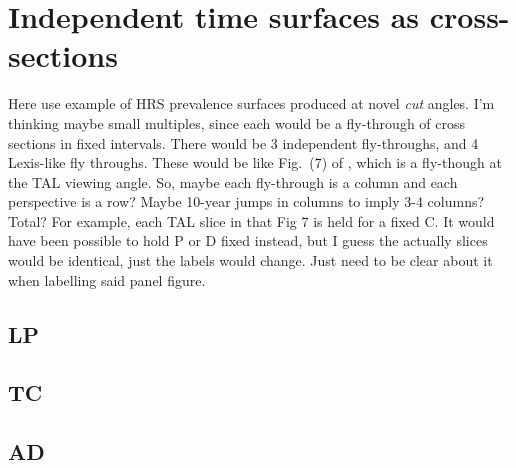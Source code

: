 \section{Independent time surfaces as cross-sections}
Here use example of HRS prevalence surfaces produced at novel \emph{cut} angles. I'm thinking maybe small multiples, since each would be a fly-through of cross sections in fixed intervals. There would be 3 independent fly-throughs, and 4 Lexis-like fly throughs. These would be  like Fig.~(7) of \citet{riffe2017demographictime}, which is a fly-though at the TAL viewing angle. So, maybe each fly-through is a column and each perspective is a row? Maybe 10-year jumps in columns to imply 3-4 columns? Total? For example, each TAL slice in that Fig 7 is held for a fixed C. It would have been possible to hold P or D fixed instead, but I guess the actually slices would be identical, just the labels would change. Just need to be clear about it when labelling said panel figure.
\subsection{LP}
\subsection{TC}
\subsection{AD}


  


